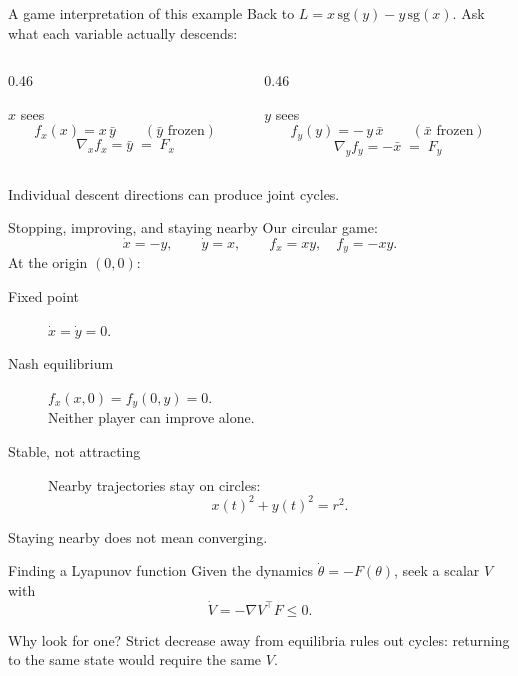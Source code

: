 \documentclass[aspectratio=169]{beamer}
\begin{document}
\begin{frame}{A game interpretation of this example}
  Back to $L = x\,\mathrm{sg}(y) - y\,\mathrm{sg}(x)$. Ask what each variable
  actually descends:

  \vspace{0.6em}
  \begin{columns}[T,onlytextwidth]
    \begin{column}{0.46\textwidth}
      \begin{block}{$x$ sees}
        \[ f_x(x) = x\,\bar y \qquad (\bar y \text{ frozen}) \]
        \[ \nabla_x f_x = \bar y \;=\; F_x \]
      \end{block}
    \end{column}
    \begin{column}{0.46\textwidth}
      \begin{block}{$y$ sees}
        \[ f_y(y) = -\,y\,\bar x \qquad (\bar x \text{ frozen}) \]
        \[ \nabla_y f_y = -\bar x \;=\; F_y \]
      \end{block}
    \end{column}
  \end{columns}

  \vspace{0.6em}
  \alert{Individual descent directions can produce joint cycles.}
\end{frame}

\begin{frame}{Stopping, improving, and staying nearby}
  Our circular game:
  \[
    \dot x=-y,\qquad \dot y=x,
    \qquad f_x=xy,\quad f_y=-xy.
  \]
  At the origin $(0,0)$:
  \begin{description}
    \item[Fixed point] $\dot x=\dot y=0$.
    \item[Nash equilibrium] $f_x(x,0)=f_y(0,y)=0$.\\
      Neither player can improve alone.
    \item[Stable, not attracting] Nearby trajectories stay on circles:
      \[
        x(t)^2+y(t)^2=r^2.
      \]
  \end{description}
  \begin{center}
    \alert{Staying nearby does not mean converging.}
  \end{center}
\end{frame}

\begin{frame}{Finding a Lyapunov function}
  Given the dynamics $\dot\theta=-F(\theta)$, seek a scalar $V$ with
  \[
    \dot V=-\nabla V^\top F\leq0.
  \]
  \begin{block}{Why look for one?}
    Strict decrease away from equilibria rules out cycles:
    returning to the same state would require the same $V$.
  \end{block}
\end{frame}
\end{document}
